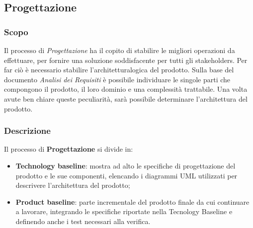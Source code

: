 	\subsection{Progettazione}
		\subsubsection{Scopo}
		Il processo di \textit{Progettazione} ha il copito di stabilire le migliori operazioni da effettuare, per fornire una soluzione soddisfacente per tutti gli stakeholders\glo. Per far ciò è necessario stabilire l'architettura\glo logica del prodotto. Sulla base del documento \textit{Analisi dei Requisiti} è possibile individuare le singole parti che compongono il prodotto, il loro dominio e una complessità trattabile. Una volta avute ben chiare queste peculiarità, sarà possibile determinare l'architettura del prodotto.
		\subsubsection{Descrizione}
		Il processo di \textbf{Progettazione} si divide in:
			\begin{itemize}
				\item \textbf{Technology baseline}: mostra ad alto le specifiche di progettazione del prodotto e le sue componenti, elencando i diagrammi UML utilizzati per descrivere l'architettura del prodotto;
				\item \textbf{Product baseline}: parte incrementale del prodotto finale da cui continuare a lavorare, integrando le specifiche riportate nella Tecnology Baseline e  definendo anche i test necessari alla verifica.
			\end{itemize} 
